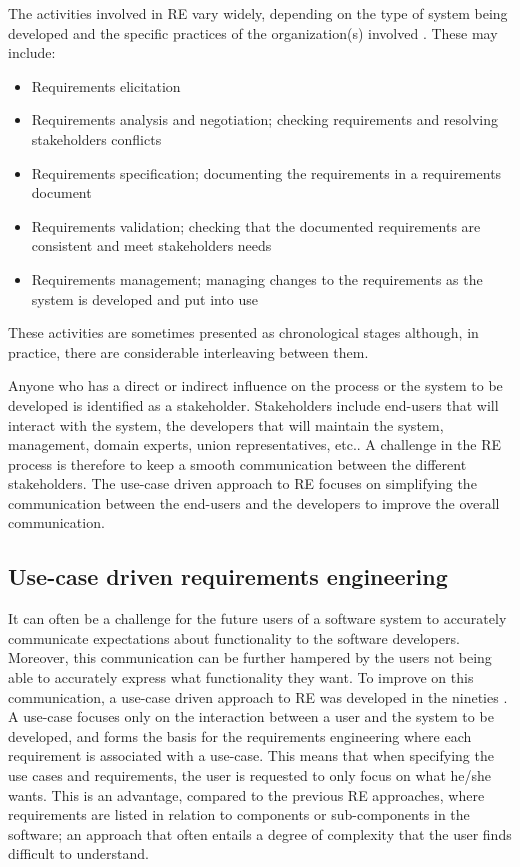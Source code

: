 The activities involved in RE vary widely, depending on the type of system being developed and the specific practices of the organization(s) involved  \cite{Som11}.  These may include:
\begin{itemize}[itemsep=2pt,parsep=2pt,topsep=4pt, partopsep=4pt]
\item Requirements elicitation 
\item Requirements analysis and negotiation; checking requirements and resolving stakeholders conflicts
\item Requirements specification; documenting the requirements in a requirements document
\item Requirements validation; checking that the documented requirements are consistent and meet stakeholders needs
\item Requirements management; managing changes to the requirements as the system is developed and put into use
\end{itemize}

These activities are sometimes presented as chronological stages although, in practice, there  are considerable interleaving between them.  

Anyone who has a direct or indirect influence on the process or the system to be developed is identified as a stakeholder.   Stakeholders include end-users that will interact with the system, the developers that will maintain the system, management, domain experts, union representatives, etc..  A challenge in the RE process is therefore to keep a smooth communication between the different stakeholders.  The use-case driven approach to RE focuses on simplifying the communication between the end-users and the developers to improve the overall communication.

\subsection{Use-case driven requirements engineering}
\label{sec:use-case-driven}
It can often be a challenge for the future users of a software system to accurately communicate expectations about functionality to the
software developers. Moreover, this communication can be further hampered by the users not
being able to accurately express what functionality they want. To improve on this communication, a use-case driven
approach to RE was developed in the
nineties  \cite{Jac92,Poh10,Coc01}.  A use-case focuses only on the interaction between a user and the system to be
developed, and forms the basis for the requirements engineering where each requirement is
associated with a use-case. This means that when specifying the use cases and requirements, the user is requested to only focus on what he/she wants.  This is an
advantage, compared to the previous RE approaches, where requirements are listed in relation to
components or sub-components in
the software; an approach that often entails a degree of complexity that the user finds difficult to understand. 


